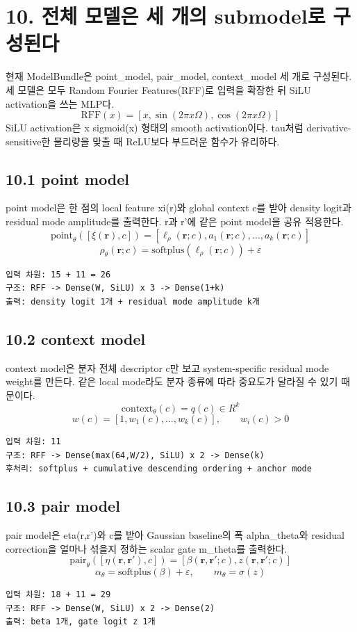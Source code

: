\documentclass[11pt]{article}
\begin{document}
\section*{10. 전체 모델은 세 개의 submodel로 구성된다}
현재 ModelBundle은 point\_model, pair\_model, context\_model 세 개로 구성된다. 세 모델은 모두 Random Fourier Features(RFF)로 입력을 확장한 뒤 SiLU activation을 쓰는 MLP다.
\[
\mathrm{RFF}(x)=\left[x,\sin(2\pi x\Omega),\cos(2\pi x\Omega)\right]
\]
SiLU activation은 x sigmoid(x) 형태의 smooth activation이다. tau처럼 derivative-sensitive한 물리량을 맞출 때 ReLU보다 부드러운 함수가 유리하다.
\subsection*{10.1 point model}
point model은 한 점의 local feature xi(r)와 global context c를 받아 density logit과 residual mode amplitude를 출력한다. r과 r'에 같은 point model을 공유 적용한다.
\[
\mathrm{point}_\theta([\xi(\mathbf{r}),c])=\left[\ell_\rho(\mathbf{r};c),a_1(\mathbf{r};c),\ldots,a_k(\mathbf{r};c)\right]
\]
\[
\rho_\theta(\mathbf{r};c)=\mathrm{softplus}(\ell_\rho(\mathbf{r};c))+\varepsilon
\]
\begin{lstlisting}
입력 차원: 15 + 11 = 26
구조: RFF -> Dense(W, SiLU) x 3 -> Dense(1+k)
출력: density logit 1개 + residual mode amplitude k개
\end{lstlisting}
\subsection*{10.2 context model}
context model은 분자 전체 descriptor c만 보고 system-specific residual mode weight를 만든다. 같은 local mode라도 분자 종류에 따라 중요도가 달라질 수 있기 때문이다.
\[
\mathrm{context}_\theta(c)=q(c)\in R^k
\]
\[
w(c)=\left[1,w_1(c),\ldots,w_k(c)\right],\qquad w_i(c)>0
\]
\begin{lstlisting}
입력 차원: 11
구조: RFF -> Dense(max(64,W/2), SiLU) x 2 -> Dense(k)
후처리: softplus + cumulative descending ordering + anchor mode
\end{lstlisting}
\subsection*{10.3 pair model}
pair model은 eta(r,r')와 c를 받아 Gaussian baseline의 폭 alpha\_theta와 residual correction을 얼마나 섞을지 정하는 scalar gate m\_theta를 출력한다.
\[
\mathrm{pair}_\theta([\eta(\mathbf{r},\mathbf{r}'),c])=\left[\beta(\mathbf{r},\mathbf{r}';c),z(\mathbf{r},\mathbf{r}';c)\right]
\]
\[
\alpha_\theta=\mathrm{softplus}(\beta)+\varepsilon,\qquad m_\theta=\sigma(z)
\]
\begin{lstlisting}
입력 차원: 18 + 11 = 29
구조: RFF -> Dense(W, SiLU) x 2 -> Dense(2)
출력: beta 1개, gate logit z 1개
\end{lstlisting}
\end{document}
